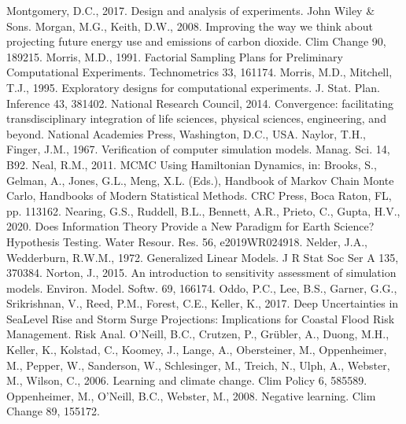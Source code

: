 \documentclass[letterpaper,10pt,english]{sphinxmanual}
\begin{document}
Montgomery, D.C., 2017. Design and analysis of experiments. John Wiley \& Sons.
Morgan, M.G., Keith, D.W., 2008. Improving the way we think about projecting future energy use and emissions of carbon dioxide. Clim Change 90, 189\textendash{}215. 
Morris, M.D., 1991. Factorial Sampling Plans for Preliminary Computational Experiments. Technometrics 33, 161\textendash{}174. 
Morris, M.D., Mitchell, T.J., 1995. Exploratory designs for computational experiments. J. Stat. Plan. Inference 43, 381\textendash{}402. 
National Research Council, 2014. Convergence: facilitating transdisciplinary integration of life sciences, physical sciences, engineering, and beyond. National Academies Press, Washington, D.C., USA.
Naylor, T.H., Finger, J.M., 1967. Verification of computer simulation models. Manag. Sci. 14, B\sphinxhyphen{}92.
Neal, R.M., 2011. MCMC Using Hamiltonian Dynamics, in: Brooks, S., Gelman, A., Jones, G.L., Meng, X.\sphinxhyphen{}L. (Eds.), Handbook of Markov Chain Monte Carlo, Handbooks of Modern Statistical Methods. CRC Press, Boca Raton, FL, pp. 113\textendash{}162.
Nearing, G.S., Ruddell, B.L., Bennett, A.R., Prieto, C., Gupta, H.V., 2020. Does Information Theory Provide a New Paradigm for Earth Science? Hypothesis Testing. Water Resour. Res. 56, e2019WR024918. 
Nelder, J.A., Wedderburn, R.W.M., 1972. Generalized Linear Models. J R Stat Soc Ser A 135, 370\textendash{}384. 
Norton, J., 2015. An introduction to sensitivity assessment of simulation models. Environ. Model. Softw. 69, 166\textendash{}174. 
Oddo, P.C., Lee, B.S., Garner, G.G., Srikrishnan, V., Reed, P.M., Forest, C.E., Keller, K., 2017. Deep Uncertainties in Sea\sphinxhyphen{}Level Rise and Storm Surge Projections: Implications for Coastal Flood Risk Management. Risk Anal. 
O’Neill, B.C., Crutzen, P., Grübler, A., Duong, M.H., Keller, K., Kolstad, C., Koomey, J., Lange, A., Obersteiner, M., Oppenheimer, M., Pepper, W., Sanderson, W., Schlesinger, M., Treich, N., Ulph, A., Webster, M., Wilson, C., 2006. Learning and climate change. Clim Policy 6, 585\textendash{}589. 
Oppenheimer, M., O’Neill, B.C., Webster, M., 2008. Negative learning. Clim Change 89, 155\textendash{}172. 
\end{document}
